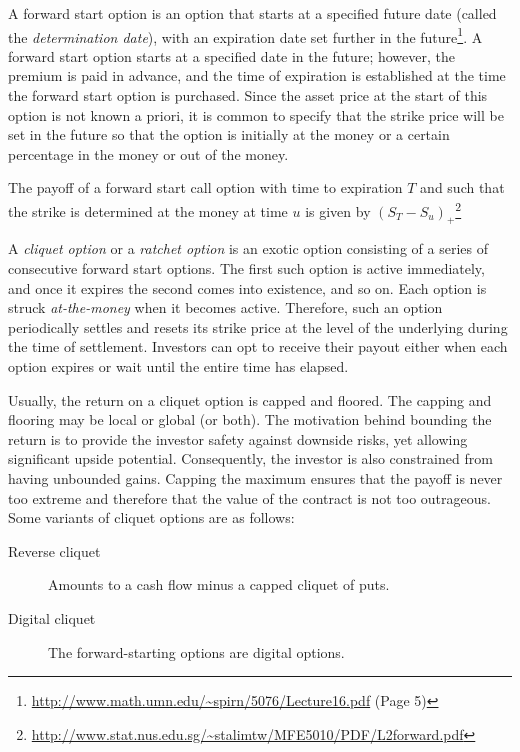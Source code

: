 
A forward start option is an option that starts at a specified future date (called the \emph{determination date}), with an expiration date set further in the future\footnote{\url{http://www.math.umn.edu/~spirn/5076/Lecture16.pdf} (Page 5)}. A forward start option starts at a specified date in the future; however, the premium is paid in advance, and the time of expiration is established at the time the forward start option is purchased. Since the asset price at the start of this option is not known a priori, it is common to specify that the strike price will be set in the future so that the option is initially at the money or a certain percentage in the money or out of the money.

The payoff of a forward start call option with time to expiration $ T $ and such that the strike is determined at the money at time $ u $ is given by $ (S_T - S_u)_+ $\footnote{\url{http://www.stat.nus.edu.sg/~stalimtw/MFE5010/PDF/L2forward.pdf}}

A \emph{cliquet option} or a \emph{ratchet option} is an exotic option consisting of a series of consecutive forward start options. The first such option is active immediately, and once it expires the second comes into existence, and so on. Each option is struck \emph{at-the-money} when it becomes active. Therefore, such an option periodically settles and resets its strike price at the level of the underlying during the time of settlement. Investors can opt to receive their payout either when each option expires or wait until the entire time has elapsed.

Usually, the return on a cliquet option is capped and floored. The capping and flooring may be local or global (or both). The motivation behind bounding the return is to provide the investor safety against downside risks, yet allowing significant upside potential. Consequently, the investor is also constrained from having unbounded gains. Capping the maximum ensures that the payoff is never too extreme and therefore that the value of the contract is not too outrageous. Some variants of cliquet options are as follows:
\begin{description}
	\item[Reverse cliquet] Amounts to a cash flow minus a capped cliquet of puts.
	\item[Digital cliquet] The forward-starting options are digital options.
\end{description}

